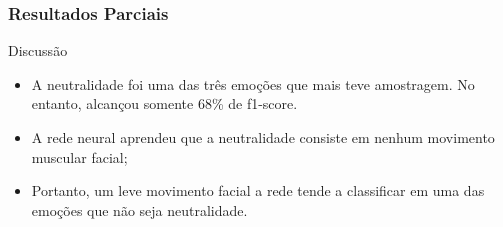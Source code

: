 \documentclass{beamer}
\begin{document}
\begin{frame}
\frametitle{Resultados Parciais}
 \begin{block}{Discussão}
\begin{itemize}
\item A neutralidade foi uma das três emoções que mais teve amostragem. No entanto, alcançou somente 68\% de f1-score.
\pause
\item A rede neural aprendeu que a neutralidade consiste em nenhum movimento muscular facial;
\pause
\item Portanto, um leve movimento facial a rede tende a classificar em uma das emoções que não seja neutralidade.
\end{itemize}
\end{block}
\end{frame}
\end{document}
